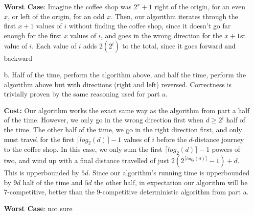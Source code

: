 \documentclass[12pt]{article}
\begin{document}
\noindent \textbf{Worst Case}: Imagine the coffee shop was $2^x+1$ right of the origin, for an even $x$, or left of the origin, for an odd $x$. Then, our algorithm iterates through the first $x+1$ values of $i$ without finding the coffee shop, since it doesn't go far enough for the first $x$ values of $i$, and goes in the wrong direction for the $x+1$st value of $i$. Each value of $i$ adds $2(2^i)$ to the total, since it goes forward and backward

b. Half of the time, perform the algorithm above, and half the time, perform the algorithm above but with directions (right and left) reversed. Correctness is trivially proven by the same reasoning used for part a.

\noindent \textbf{Cost:} Our algorithm works the exact same way as the algorithm from part a half of the time. However, we only go in the wrong direction first when $d \geq 2^i$ half of the time. The other half of the time, we go in the right direction first, and only must travel for the first $\lceil log_2(d) \rceil-1$ values of $i$ before the $d$-distance journey to the coffee shop. In this case, we only sum the first $\lceil log_2(d) \rceil-1$ powers of two, and wind up with a final distance travelled of just $2(2^{\lceil log_2(d) \rceil}-1)+d$. This is upperbounded by $5d$. Since our algorithm's running time is upperbounded by $9d$ half of the time and $5d$ the other half, in expectation our algorithm will be 7-competitive, better than the 9-competitive deterministic algorithm from part a.

\noindent \textbf{Worst Case}: not sure
\end{document}
